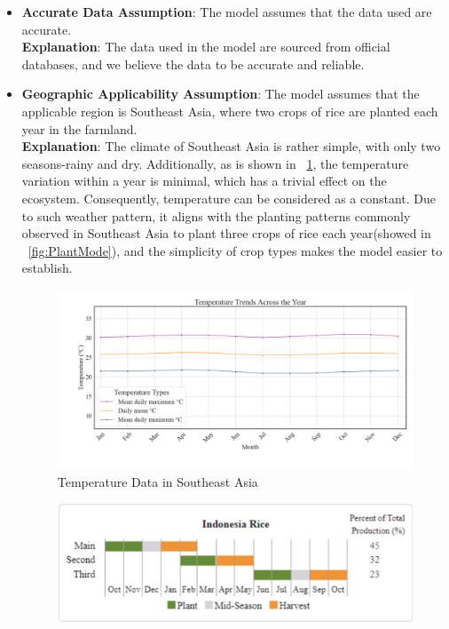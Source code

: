 \documentclass{HZNUMCM}
\begin{document}
      \begin{itemize}
        \item \textbf{Accurate Data Assumption}: The model assumes that the data used are accurate.\\
        \textbf{Explanation}: The data used in the model are sourced from official databases, and we believe the data to be accurate and reliable.
        \item \textbf{Geographic Applicability Assumption}: The model assumes that the applicable region is Southeast Asia,
         where two crops of rice are planted each year in the farmland.\\
        \textbf{Explanation}: The climate of Southeast Asia is rather simple, 
        with only two seasons-rainy and dry. Additionally, as is shown in \figurename~\ref{fig:Temperature},
        the temperature variation within a year is minimal, which has a trivial effect on the ecosystem.
        Consequently, temperature can be considered as a constant.
        Due to such weather pattern, it aligns with the planting patterns commonly observed in Southeast Asia to plant three crops of rice each year(showed in \figurename~\ref{fig:PlantMode}),
         and the simplicity of crop types makes the model easier to establish.
        \begin{figure}[H]
          \centering
          \includegraphics[width=\linewidth]{images/AverTemper.png}
          \caption{Temperature Data in Southeast Asia\cite{IndoTemper}}
          \label{fig:Temperature}
        \end{figure}
        \begin{figure}[H]
          \centering
          \includegraphics[width=0.75\linewidth]{images/PlantMode.jpg}

\end{figure}
\end{itemize}
\end{document}
